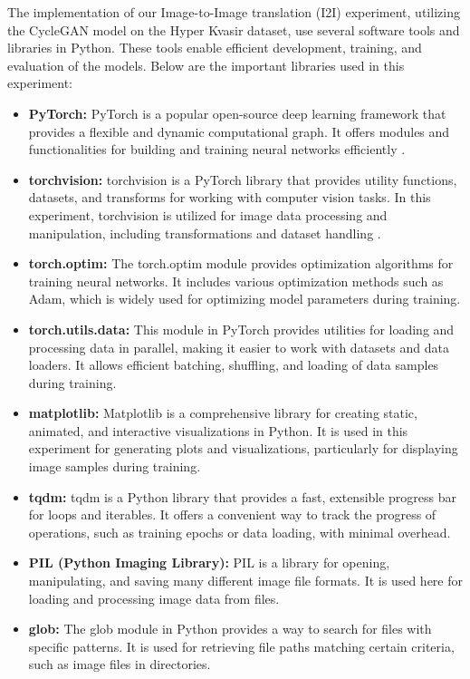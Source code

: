 \documentclass[UKenglish,12pt]{master-style}
\begin{document}
The implementation of our Image-to-Image translation (I2I) experiment, utilizing the CycleGAN model on the Hyper Kvasir dataset, use several software tools and libraries in Python. These tools enable efficient development, training, and evaluation of the models. Below are the important libraries used in this experiment:
\begin{itemize}

\item \textbf{PyTorch: }PyTorch is a popular open-source deep learning framework that provides a flexible and dynamic computational graph. It offers modules and functionalities for building and training neural networks efficiently \cite{PyTorch_horse2zebra}.

\item \textbf{torchvision:} torchvision is a PyTorch library that provides utility functions, datasets, and transforms for working with computer vision tasks. In this experiment, torchvision is utilized for image data processing and manipulation, including transformations and dataset handling \cite{PyTorch_horse2zebra}.

\item \textbf{torch.optim: }The torch.optim module provides optimization algorithms for training neural networks. It includes various optimization methods such as Adam, which is widely used for optimizing model parameters during training.

\item \textbf{torch.utils.data:} This module in PyTorch provides utilities for loading and processing data in parallel, making it easier to work with datasets and data loaders. It allows efficient batching, shuffling, and loading of data samples during training.

\item \textbf{matplotlib: }Matplotlib is a comprehensive library for creating static, animated, and interactive visualizations in Python. It is used in this experiment for generating plots and visualizations, particularly for displaying image samples during training.

\item \textbf{tqdm: }tqdm is a Python library that provides a fast, extensible progress bar for loops and iterables. It offers a convenient way to track the progress of operations, such as training epochs or data loading, with minimal overhead.

\item \textbf{PIL (Python Imaging Library):} PIL is a library for opening, manipulating, and saving many different image file formats. It is used here for loading and processing image data from files.

\item \textbf{glob: }The glob module in Python provides a way to search for files with specific patterns. It is used for retrieving file paths matching certain criteria, such as image files in directories.
\end{itemize}
\end{document}
